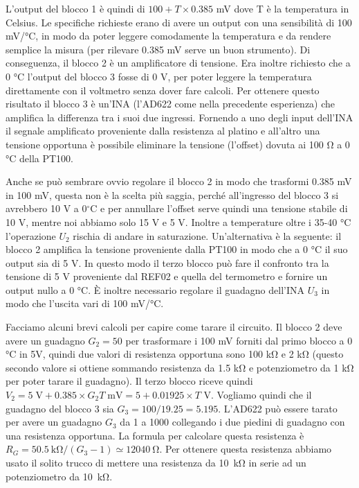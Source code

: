 L'output del blocco 1 è quindi di $100 + T\times0.385$ mV dove T è la temperatura in Celsius.
Le specifiche richieste erano di avere un output con una sensibilità di 100 mV/\si{\celsius}, 
in modo da poter leggere comodamente la temperatura e da rendere semplice la misura (per rilevare
0.385 mV serve un buon strumento). Di conseguenza, il blocco 2 è un amplificatore di tensione.
Era inoltre richiesto che a 0 \si{\celsius} l'output del blocco 3 fosse di 0 V, per poter leggere
la temperatura direttamente con il voltmetro senza dover fare calcoli. Per ottenere
questo risultato il blocco 3 è un'INA (l'AD622 come nella precedente esperienza) che amplifica
la differenza tra i suoi due ingressi. Fornendo a uno degli input dell'INA il segnale amplificato proveniente
dalla resistenza al platino e all'altro una tensione opportuna è possibile eliminare la tensione
(l'offset) dovuta ai 100 \si{\ohm} a 0 \si{\celsius} della PT100.

Anche se può sembrare ovvio regolare il blocco 2 in modo che trasformi 0.385 mV in 100 mV, questa
non è la scelta più saggia, perché all'ingresso del blocco 3 si avrebbero 10 V a 0$^\circ$C e per annullare l'offset
serve quindi una tensione stabile di 10 V, mentre noi abbiamo solo 15 V e 5 V. Inoltre a temperature oltre i 35-40 \si{\celsius}
l'operazione $U_2$ rischia di andare in saturazione. Un'alternativa è la seguente:
il blocco 2 amplifica la tensione proveniente dalla PT100 in modo che a 0 \si{\celsius} il suo output sia
di 5 V. In questo modo il terzo blocco può fare il confronto tra la tensione di 5 V proveniente dal REF02 e quella
del termometro e fornire un output nullo a 0 \si{\celsius}. È inoltre necessario regolare il guadagno dell'INA $U_3$
in modo che l'uscita vari di 100 mV/\si{\celsius}.

Facciamo alcuni brevi calcoli per capire come tarare il circuito. Il blocco 2 deve avere un guadagno $G_2 = 50$
per trasformare i 100 mV forniti dal primo blocco a 0 \si{\celsius} in 5V, quindi due valori di resistenza opportuna
sono 100 \si{\kilo\ohm} e 2 \si{\kilo\ohm} (questo secondo valore si ottiene sommando resistenza da 1.5 \si{\kilo\ohm}
e potenziometro da 1 \si{\kilo\ohm} per poter tarare il guadagno). Il terzo blocco riceve quindi
$V_2 = 5 \;\si{\volt} + 0.385 \times G_2T\; \si{\milli\volt} = 5 + 0.01925 \times T$ V.
Vogliamo quindi che il guadagno del blocco 3 sia $G_3 = 100/19.25 = 5.195$. L'AD622 può essere tarato per avere
un guadagno $G_3$ da 1 a 1000 collegando i due piedini di guadagno con una resistenza opportuna. La formula per
calcolare questa resistenza è $R_G = \SI{50.5}{\kilo\ohm}/(G_3 - 1) \simeq \SI{12040}{\ohm}$. Per ottenere questa
resistenza abbiamo usato il solito trucco di mettere una resistenza da \SI{10}{\kilo\ohm} in serie ad un potenziometro
da \SI{10}{\kilo\ohm}.

